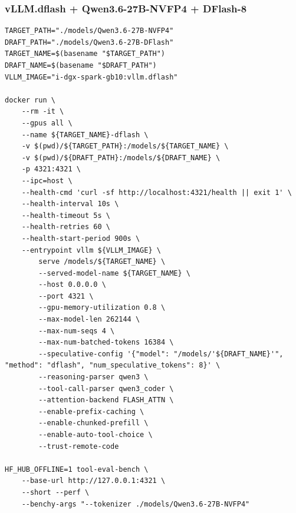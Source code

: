 \documentclass{article}
\begin{document}
\subsubsection{vLLM.dflash + Qwen3.6-27B-NVFP4 + DFlash-8}
\begin{lstlisting}
TARGET_PATH="./models/Qwen3.6-27B-NVFP4"
DRAFT_PATH="./models/Qwen3.6-27B-DFlash"
TARGET_NAME=$(basename "$TARGET_PATH")
DRAFT_NAME=$(basename "$DRAFT_PATH")
VLLM_IMAGE="i-dgx-spark-gb10:vllm.dflash"

docker run \
    --rm -it \
    --gpus all \
    --name ${TARGET_NAME}-dflash \
    -v $(pwd)/${TARGET_PATH}:/models/${TARGET_NAME} \
    -v $(pwd)/${DRAFT_PATH}:/models/${DRAFT_NAME} \
    -p 4321:4321 \
    --ipc=host \
    --health-cmd 'curl -sf http://localhost:4321/health || exit 1' \
    --health-interval 10s \
    --health-timeout 5s \
    --health-retries 60 \
    --health-start-period 900s \
    --entrypoint vllm ${VLLM_IMAGE} \
        serve /models/${TARGET_NAME} \
        --served-model-name ${TARGET_NAME} \
        --host 0.0.0.0 \
        --port 4321 \
        --gpu-memory-utilization 0.8 \
        --max-model-len 262144 \
        --max-num-seqs 4 \
        --max-num-batched-tokens 16384 \
        --speculative-config '{"model": "/models/'${DRAFT_NAME}'", "method": "dflash", "num_speculative_tokens": 8}' \
        --reasoning-parser qwen3 \
        --tool-call-parser qwen3_coder \
        --attention-backend FLASH_ATTN \
        --enable-prefix-caching \
        --enable-chunked-prefill \
        --enable-auto-tool-choice \
        --trust-remote-code

HF_HUB_OFFLINE=1 tool-eval-bench \
    --base-url http://127.0.0.1:4321 \
    --short --perf \
    --benchy-args "--tokenizer ./models/Qwen3.6-27B-NVFP4"
\end{lstlisting}
\end{document}
